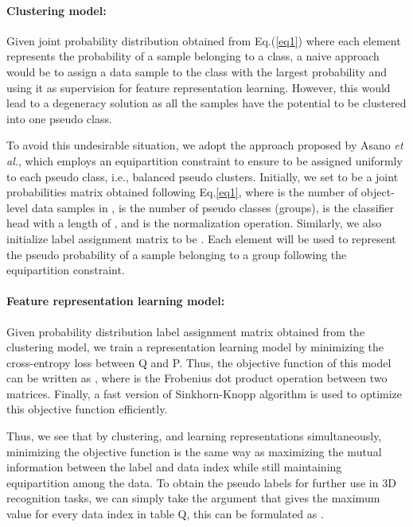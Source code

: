 \documentclass{article}
\begin{document}
\paragraph{Clustering model:} Given joint probability distribution  obtained from Eq.(\ref{eq1}) where each element represents the probability of a sample belonging to a class, a naive approach would be to assign a data sample to the class with the largest probability
and using it as supervision for feature representation learning. However, this would lead to a degeneracy solution as all the samples  have the potential to be clustered into one pseudo class. 
 
\setlength{\parskip}{0.0em}
To avoid this undesirable situation, we adopt the approach proposed by Asano \textit{et al.}\cite{asano2020self}, which employs an equipartition constraint to ensure  to be assigned uniformly to each pseudo class, i.e., balanced pseudo clusters. 
Initially, we set  to be a  joint probabilities matrix obtained following Eq.\eqref{eq1}, where  is the number of object-level data samples in ,  is the number of pseudo classes (groups),  is the classifier head with a length of , and  is the normalization operation. Similarly, we also initialize label assignment matrix  to be . Each element  will be used to represent the pseudo probability of a sample  belonging to a group  following the equipartition constraint.

\paragraph{Feature representation learning model:} Given probability distribution  label assignment matrix  obtained from the clustering model, we train a representation learning model by minimizing the cross-entropy loss  between Q and P. Thus, the objective function of this model can be written as , where  is the Frobenius dot product operation between two matrices. Finally, a fast version of Sinkhorn-Knopp algorithm \cite{cuturi2013sinkhorn} is used to optimize this objective function efficiently.

\setlength{\parskip}{0.0em}

Thus, we see that by clustering, and learning representations simultaneously, minimizing the objective function is the same way as maximizing the mutual information between the label and data index  while still maintaining equipartition among the  data. To obtain the pseudo labels  for further use in 3D recognition tasks, we can simply take the argument that gives the maximum value for every data index in table Q, this can be formulated as .
\end{document}

